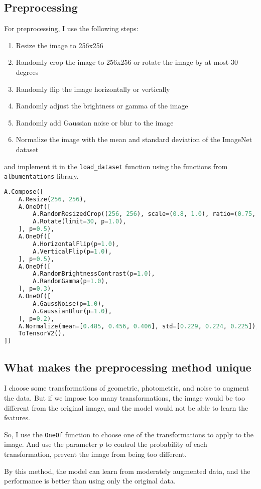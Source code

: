 
\subsection{Preprocessing}

For preprocessing, I use the following steps:
\begin{enumerate}
    \item Resize the image to 256x256
    \item Randomly crop the image to 256x256 or rotate the image by at most 30 degrees
    \item Randomly flip the image horizontally or vertically
    \item Randomly adjust the brightness or gamma of the image
    \item Randomly add Gaussian noise or blur to the image
    \item Normalize the image with the mean and standard deviation of the ImageNet dataset
\end{enumerate}

and implement it in the \lstinline{load_dataset} function using the functions from \lstinline{albumentations} library.

\begin{lstlisting}[language=Python, caption=oxford\_pet.py: load\_dataset, label=lst:load_dataset]
A.Compose([
    A.Resize(256, 256),
    A.OneOf([
        A.RandomResizedCrop((256, 256), scale=(0.8, 1.0), ratio=(0.75, 1.33), p=1.0),
        A.Rotate(limit=30, p=1.0),
    ], p=0.5),
    A.OneOf([
        A.HorizontalFlip(p=1.0),
        A.VerticalFlip(p=1.0),
    ], p=0.5),
    A.OneOf([
        A.RandomBrightnessContrast(p=1.0),
        A.RandomGamma(p=1.0),
    ], p=0.3),
    A.OneOf([
        A.GaussNoise(p=1.0),
        A.GaussianBlur(p=1.0),
    ], p=0.2),
    A.Normalize(mean=[0.485, 0.456, 0.406], std=[0.229, 0.224, 0.225]),
    ToTensorV2(),
])
\end{lstlisting}

\subsection{What makes the preprocessing method unique}
I choose some transformations of geometric, photometric, and noise to augment the data. But if we impose too many transformations, the image would be too different from the original image, and the model would not be able to learn the features.

So, I use the \lstinline{OneOf} function to choose one of the transformations to apply to the image. And use the parameter $p$ to control the probability of each transformation, prevent the image from being too different.

By this method, the model can learn from moderately augmented data, and the performance is better than using only the original data.
